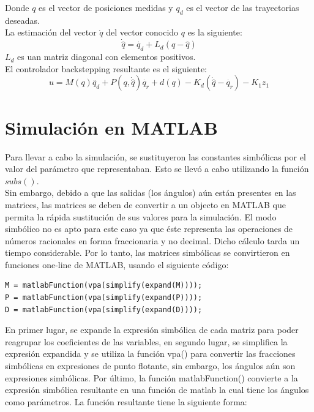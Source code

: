 \documentclass[conference]{IEEEtran}
\begin{document}
Donde $q$ es el vector de posiciones medidas y $q_d$ es el vector de las trayectorias deseadas. \\
La estimación del vector $\dot{q}$ del vector conocido $q$ es la siguiente:
\begin{equation}
    \dot{\hat{q}} = \dot{q_d} + L_d(q - \hat{q})
\end{equation}
$L_d$ es uan matriz diagonal con elementos positivos.\\
El controlador backstepping resultante es el siguiente:
\begin{equation}
    u = M(q)\ddot{q_d} + P(q,\dot{\hat{q}})\dot{q_r} + d(q) - K_d(\dot{\hat{q}} - \dot{q_r}) - K_1 z_1
\end{equation}

\section{Simulación en MATLAB}
Para llevar a cabo la simulación, se sustituyeron las constantes simbólicas por el valor del parámetro que representaban. Esto se llevó a cabo utilizando la función $subs()$.\\
Sin embargo, debido a que las salidas (los ángulos) aún están presentes en las matrices, las matrices se deben de convertir a un objecto en MATLAB que permita la rápida sustitución de sus valores para la simulación. El modo simbólico no es apto para este caso ya que éste representa las operaciones de números racionales en forma fraccionaria y no decimal. Dicho cálculo tarda un tiempo considerable. Por lo tanto, las matrices simbólicas se convirtieron en funciones one-line de MATLAB, usando el siguiente código:

\begin{lstlisting}
M = matlabFunction(vpa(simplify(expand(M))));
P = matlabFunction(vpa(simplify(expand(P))));
D = matlabFunction(vpa(simplify(expand(D))));
\end{lstlisting}

En primer lugar, se expande la expresión simbólica de cada matriz para poder reagrupar los coeficientes de las variables, en segundo lugar, se simplifica la expresión expandida y se utiliza la función vpa() para convertir las fracciones simbólicas en expresiones de punto flotante, sin embargo, los ángulos aún son expresiones simbólicas. Por último, la función matlabFunction() convierte a la expresión simbólica resultante en una función de matlab la cual tiene los ángulos como parámetros. La función resultante tiene la siguiente forma:
\end{document}
